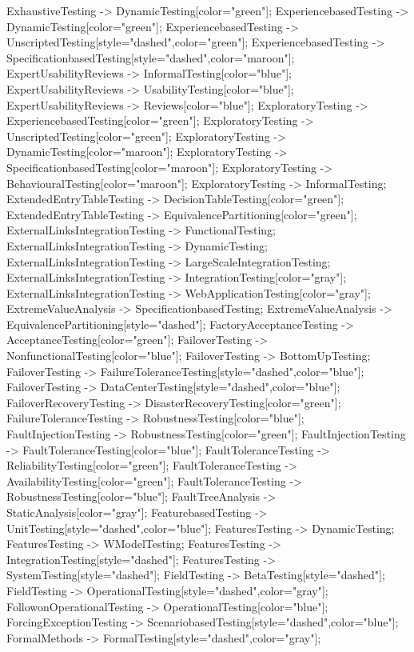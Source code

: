 \documentclass{article}
\begin{document}
{ExhaustiveTesting -> DynamicTesting[color="green"];
ExperiencebasedTesting -> DynamicTesting[color="green"];
ExperiencebasedTesting -> UnscriptedTesting[style="dashed",color="green"];
ExperiencebasedTesting -> SpecificationbasedTesting[style="dashed",color="maroon"];
ExpertUsabilityReviews -> InformalTesting[color="blue"];
ExpertUsabilityReviews -> UsabilityTesting[color="blue"];
ExpertUsabilityReviews -> Reviews[color="blue"];
ExploratoryTesting -> ExperiencebasedTesting[color="green"];
ExploratoryTesting -> UnscriptedTesting[color="green"];
ExploratoryTesting -> DynamicTesting[color="maroon"];
ExploratoryTesting -> SpecificationbasedTesting[color="maroon"];
ExploratoryTesting -> BehaviouralTesting[color="maroon"];
ExploratoryTesting -> InformalTesting;
ExtendedEntryTableTesting -> DecisionTableTesting[color="green"];
ExtendedEntryTableTesting -> EquivalencePartitioning[color="green"];
ExternalLinksIntegrationTesting -> FunctionalTesting;
ExternalLinksIntegrationTesting -> DynamicTesting;
ExternalLinksIntegrationTesting -> LargeScaleIntegrationTesting;
ExternalLinksIntegrationTesting -> IntegrationTesting[color="gray"];
ExternalLinksIntegrationTesting -> WebApplicationTesting[color="gray"];
ExtremeValueAnalysis -> SpecificationbasedTesting;
ExtremeValueAnalysis -> EquivalencePartitioning[style="dashed"];
FactoryAcceptanceTesting -> AcceptanceTesting[color="green"];
FailoverTesting -> NonfunctionalTesting[color="blue"];
FailoverTesting -> BottomUpTesting;
FailoverTesting -> FailureToleranceTesting[style="dashed",color="blue"];
FailoverTesting -> DataCenterTesting[style="dashed",color="blue"];
FailoverRecoveryTesting -> DisasterRecoveryTesting[color="green"];
FailureToleranceTesting -> RobustnessTesting[color="blue"];
FaultInjectionTesting -> RobustnessTesting[color="green"];
FaultInjectionTesting -> FaultToleranceTesting[color="blue"];
FaultToleranceTesting -> ReliabilityTesting[color="green"];
FaultToleranceTesting -> AvailabilityTesting[color="green"];
FaultToleranceTesting -> RobustnessTesting[color="blue"];
FaultTreeAnalysis -> StaticAnalysis[color="gray"];
FeaturebasedTesting -> UnitTesting[style="dashed",color="blue"];
FeaturesTesting -> DynamicTesting;
FeaturesTesting -> WModelTesting;
FeaturesTesting -> IntegrationTesting[style="dashed"];
FeaturesTesting -> SystemTesting[style="dashed"];
FieldTesting -> BetaTesting[style="dashed"];
FieldTesting -> OperationalTesting[style="dashed",color="gray"];
FollowonOperationalTesting -> OperationalTesting[color="blue"];
ForcingExceptionTesting -> ScenariobasedTesting[style="dashed",color="blue"];
FormalMethods -> FormalTesting[style="dashed",color="gray"];
}
\end{document}
